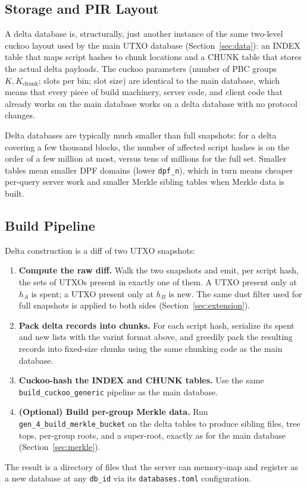 \subsection{Storage and PIR Layout}

A delta database is, structurally, just another instance of the same two-level cuckoo layout used by the main UTXO database (Section~\ref{sec:data}): an INDEX table that maps script hashes to chunk locations and a CHUNK table that stores the actual delta payloads. The cuckoo parameters (number of PBC groups $K, K_\text{chunk}$; slots per bin; slot size) are identical to the main database, which means that every piece of build machinery, server code, and client code that already works on the main database works on a delta database with no protocol changes.

Delta databases are typically much smaller than full snapshots: for a delta covering a few thousand blocks, the number of affected script hashes is on the order of a few million at most, versus tens of millions for the full set. Smaller tables mean smaller DPF domains (lower \texttt{dpf\_n}), which in turn means cheaper per-query server work and smaller Merkle sibling tables when Merkle data is built.

\subsection{Build Pipeline}

Delta construction is a diff of two UTXO snapshots:
\begin{enumerate}[nolistsep,leftmargin=*]
    \item \textbf{Compute the raw diff.} Walk the two snapshots and emit, per script hash, the sets of UTXOs present in exactly one of them. A UTXO present only at $h_A$ is spent; a UTXO present only at $h_B$ is new. The same dust filter used for full snapshots is applied to both sides (Section~\ref{sec:extension}).
    \item \textbf{Pack delta records into chunks.} For each script hash, serialize its spent and new lists with the varint format above, and greedily pack the resulting records into fixed-size chunks using the same chunking code as the main database.
    \item \textbf{Cuckoo-hash the INDEX and CHUNK tables.} Use the same \texttt{build\_cuckoo\_generic} pipeline as the main database.
    \item \textbf{(Optional) Build per-group Merkle data.} Run \texttt{gen\_4\_build\_merkle\_bucket} on the delta tables to produce sibling files, tree tops, per-group roots, and a super-root, exactly as for the main database (Section~\ref{sec:merkle}).
\end{enumerate}
The result is a directory of files that the server can memory-map and register as a new database at any \texttt{db\_id} via its \texttt{databases.toml} configuration.

